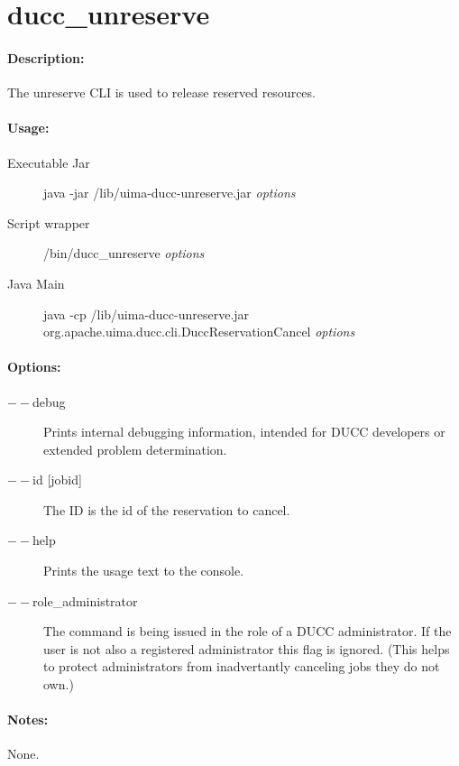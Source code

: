 \ifpdf
\else
{}
\fi
    \section{ducc\_unreserve}
    \label{sec:cli.unreserve}

    \paragraph{Description:}
    The unreserve CLI is used to release reserved resources. 

    \paragraph{Usage:}
    \begin{description}
    \item[Executable Jar] java -jar \ducchome/lib/uima-ducc-unreserve.jar {\em options}
    \item[Script wrapper] \ducchome/bin/ducc\_unreserve {\em options}
    \item[Java Main]      java -cp \ducchome/lib/uima-ducc-unreserve.jar org.apache.uima.ducc.cli.DuccReservationCancel {\em options}
    \end{description}

    \paragraph{Options:}
    \begin{description}
        \item[$--$debug ]          
          Prints internal debugging information, intended for DUCC developers or extended problem determination.
        \item[$--$id {[jobid]}]
          The ID is the id of the reservation to cancel.
        \item[$--$help]
          Prints the usage text to the console. 
        \item[$--$role\_administrator] The command is being issued in the role of a DUCC administrator.
          If the user is not also a registered administrator this flag is ignored.  (This helps to
          protect administrators from inadvertantly canceling jobs they do not own.)          
     \end{description}
        
    \paragraph{Notes:}
    None.

